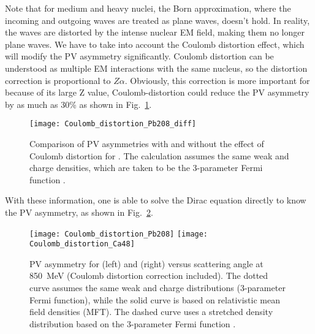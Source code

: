 Note that for medium and heavy nuclei, the Born approximation,
where the incoming and outgoing waves are treated as plane waves,
doesn't hold. 
In reality, the waves are distorted by the intense nuclear EM field, making them
no longer plane waves. We have to take into account the 
Coulomb distortion effect, which will modify the PV asymmetry significantly.
Coulomb distortion can be understood as multiple EM interactions with
the same nucleus, so the distortion correction is proportional to $Z\alpha$. 
Obviously, this correction is more important for \Pb because of its large Z value,
Coulomb-distortion could reduce the PV asymmetry by as much as 30\% as shown 
in Fig.~\ref{fig:diff_by_Coulomb_distortion}.
\begin{figure}[!h]
    \centering
    \texttt{[image: Coulomb\_distortion\_Pb208\_diff]}
    \caption{Comparison of PV asymmetries with and without the effect of Coulomb
    distortion for \Pb. The calculation assumes the same weak and charge densities,
    which are taken to be the 3-parameter Fermi function \cite{PhysRevC.57.3430}.
    }
    \label{fig:diff_by_Coulomb_distortion}
\end{figure}

With these information, one is able to solve the Dirac equation directly to know
the PV asymmetry, as shown in Fig.~\ref{fig:Coulomb_distortion}.

\begin{figure}[!h]
    \texttt{[image: Coulomb\_distortion\_Pb208]}
    \texttt{[image: Coulomb\_distortion\_Ca48]}
    \caption{PV asymmetry for \Pb (left) and \Ca (right) versus scattering angle 
    at 850~MeV (Coulomb distortion correction included). 
    The dotted curve assumes the same weak and charge distributions (3-parameter Fermi function), 
    while the solid curve is based on relativistic mean field densities (MFT).
    The dashed curve uses a stretched density distribution based on the 3-parameter Fermi function \cite{PhysRevC.57.3430}.
    }
    \label{fig:Coulomb_distortion}
\end{figure}

